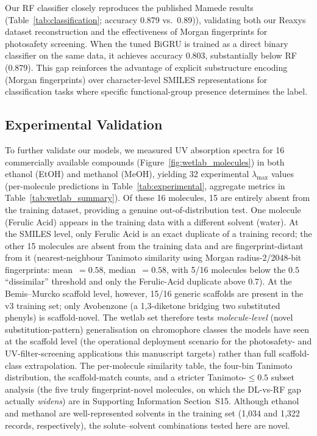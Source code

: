 \documentclass[journal=jcisd8,manuscript=article]{achemso}
\newcommand{\added}[1]{{\color{addedblue}#1}}
\newcommand{\removed}[1]{{\color{removedred}#1}}
\begin{document}
Our RF classifier closely reproduces the published Mamede results\added{ (Table~\ref{tab:classification};} accuracy 0.879 vs.\ 0.89\removed{)}\added{)}, validating both our Reaxys dataset reconstruction and the effectiveness of Morgan fingerprints for photosafety screening.
When the tuned BiGRU is trained as a direct binary classifier on the same data, it achieves accuracy 0.803, substantially below RF (0.879).
This gap reinforces the advantage of explicit substructure encoding (Morgan fingerprints) over character-level SMILES representations for classification tasks where specific functional-group presence determines the label.


\subsection{Experimental Validation}
\label{sec:experimental}

To further validate our models, we measured UV absorption spectra for 16 commercially available compounds (Figure~\ref{fig:wetlab_molecules}) in both ethanol (EtOH) and methanol (MeOH), yielding 32 experimental $\lambda_{\max}$ values\added{ (per-molecule predictions in Table~\ref{tab:experimental}, aggregate metrics in Table~\ref{tab:wetlab_summary})}.
\removed{Of these 16 molecules, 15 are entirely absent from the training dataset, providing a genuine out-of-distribution test.}
\removed{One molecule (Ferulic Acid) appears in the training data with a different solvent (water).}
\added{At the SMILES level, only Ferulic Acid is an exact duplicate of a training record; the other 15 molecules are absent from the training data and are fingerprint-distant from it (nearest-neighbour Tanimoto similarity using Morgan radius-2/2048-bit fingerprints: mean~$= 0.58$, median~$= 0.58$, with 5/16 molecules below the $0.5$ ``dissimilar'' threshold and only the Ferulic-Acid duplicate above $0.7$). At the Bemis--Murcko scaffold level, however, 15/16 generic scaffolds are present in the v3 training set; only Avobenzone (a 1,3-diketone bridging two substituted phenyls) is scaffold-novel. The wetlab set therefore tests \emph{molecule-level} (novel substitution-pattern) generalisation on chromophore classes the models have seen at the scaffold level (the operational deployment scenario for the photosafety- and UV-filter-screening applications this manuscript targets) rather than full scaffold-class extrapolation. The per-molecule similarity table, the four-bin Tanimoto distribution, the scaffold-match counts, and a stricter Tanimoto-$\leq 0.5$ subset analysis (the five truly fingerprint-novel molecules, on which the DL-vs-RF gap actually \emph{widens}) are in Supporting Information Section~S15.}
Although ethanol and methanol are well-represented solvents in the training set (1,034 and 1,322 records, respectively), the solute--solvent combinations tested here are novel.
\end{document}
